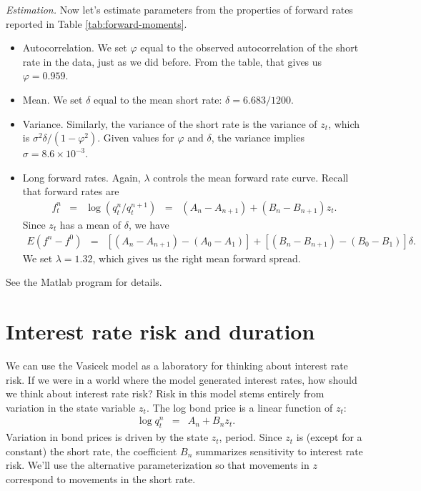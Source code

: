 \documentclass[11pt]{article}
\begin{document}
{\it Estimation.\/}
Now let's estimate parameters from the properties of forward rates
reported in Table \ref{tab:forward-moments}.
%
\begin{itemize}
\item Autocorrelation.
We set $\varphi$ equal to the observed autocorrelation of the short rate in the data,
just as we did before.
From the table, that gives us $\varphi = 0.959$.

\item Mean.  We set $\delta$ equal to the mean short rate:
$\delta = 6.683/1200$.

\item Variance.  Similarly, the variance of the short rate is the variance of $z_t$,
which is $ \sigma^2 \delta/(1-\varphi^2)$.
Given values for $\varphi$ and $\delta$,
the variance implies $\sigma = 8.6\times 10^{-3}$.

\item Long forward rates.  Again,
$\lambda$ controls the mean forward rate curve.
Recall that forward rates are
\begin{eqnarray*}
    f^n_t &=& \log (q^n_t/q^{n+1}_t)
                \;\;=\;\;  (A_n - A_{n+1}) + (B_n - B_{n+1}) z_t .
\end{eqnarray*}
Since $z_t$ has a  mean of $\delta$,  we have
\begin{eqnarray*}
    E (f^n - f^0) &=&  [(A_n - A_{n+1}) - (A_0 - A_{1})] +
        [(B_n - B_{n+1}) - (B_0 - B_{1})] \delta.
\end{eqnarray*}
We set $\lambda=1.32$, which gives us the right mean forward spread.

\end{itemize}
See the Matlab program for details.



\section{Interest rate risk and duration}

We can use the Vasicek model as a laboratory for thinking about interest rate risk.
If we were in a world where the model generated interest rates,
how should we think about interest rate risk?
Risk in this model stems entirely from variation in the state variable $z_t$.
The log bond price is a linear function of $z_t$:
\begin{eqnarray*}
    \log q^n_t &=& A_n + B_n z_t .
\end{eqnarray*}
Variation in bond prices is driven by the state $z_t$, period.
Since $z_t$ is (except for a constant) the short rate,
the coefficient $B_n$ summarizes sensitivity to interest rate risk.
We'll use the alternative parameterization so that movements in $z$
correspond to movements in the short rate.
\end{document}

